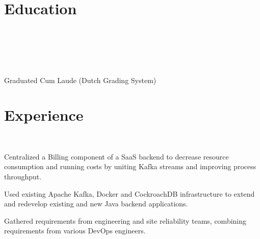 \documentclass[]{deedy-resume-openfont}
\begin{document}
    
%
%


%
%

\section{Education}
\raggedright

\\ \\
    
\sectionsep

\\ \\
Graduated Cum Laude (Dutch Grading System)\\

\sectionsep


%
%
\section{Experience}

\\ 
\begin{tightemize}
	\item Centralized a Billing component of a SaaS backend to decrease resource consumption and running costs by uniting Kafka streams and improving process throughput.
	\item Used existing Apache Kafka, Docker and CockroachDB infrastructure to extend and redevelop existing and new Java backend applications.
	\item Gathered requirements from engineering and site reliability teams, combining requirements from various DevOps engineers.
\end{tightemize}
\end{document}
